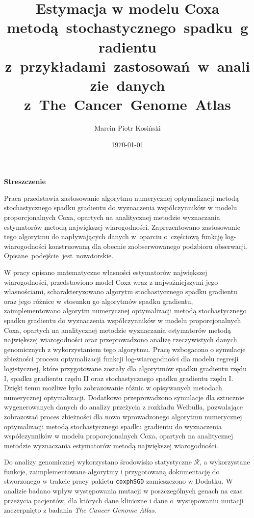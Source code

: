 \documentclass[]{mini}
\title{Estymacja w modelu Coxa metodą~stochastycznego~spadku~gradientu z~przykładami~zastosowań~w~analizie~danych z~The~Cancer~Genome~Atlas}
\author{Marcin Piotr Kosiński}
\date{\today}
\begin{document}
\maketitle

\begin{center}
\textbf{Streszczenie}
\end{center}

Praca przedstawia zastosowanie algorytmu numerycznej optymalizacji metodą stochastycznego spadku gradientu do wyznaczenia współczynników w modelu proporcjonalnych Coxa, opartych na analitycznej metodzie wyznaczania estymatorów metodą największej wiarogodności. Zaprezentowano zastosowanie tego algorytmu do napływających danych w~oparciu o~częściową funkcję log-wiarogodności konstruowaną dla obecnie zaobserwowanego podzbioru obserwacji. Opisane~podejście~jest~nowatorskie. 

W pracy opisano matematyczne własności estymatorów największej wiarogodności, przedstawiono model Coxa wraz z najważniejszymi jego własnościami, scharakteryzowano algorytm stochastycznego spadku gradientu oraz jego różnice w stosunku go algorytmów spadku gradientu, zaimplementowano algorytm numerycznej optymalizacji metodą stochastycznego spadku gradientu do wyznaczenia współczynników w modelu proporcjonalnych Coxa, opartych na analitycznej metodzie wyznaczania estymatorów metodą największej wiarogodności oraz przeprowadzono analizę rzeczywistych danych genomicznych z wykorzystaniem tego algorytmu. Pracę wzbogacono o symulacje zbieżności procesu optymalizacji funkcji log-wiarogodności dla modelu regresji logistycznej, które przygotowane zostały dla algorytmów spadku gradientu rzędu I, spadku gradientu rzędu II oraz stochastycznego spadku gradientu rzędu I. Dzięki temu możliwe było zobrazowanie różnic w opisywanych metodach numerycznej optymalizacji. Dodatkowo przeprowadzono symulacje dla sztucznie wygenerowanych danych do analizy przeżycia z rozkładu Weibulla, pozwalające zobrazować proces zbieżności dla nowo wprowadzonego algorytmu numerycznej optymalizacji metodą stochastycznego spadku gradientu do wyznaczenia współczynników w modelu proporcjonalnych Coxa, opartych na analitycznej metodzie wyznaczania estymatorów metodą największej wiarogodności.

Do analizy genomicznej wykorzystano środowisko statystyczne $\mathcal{R}$, a wykorzystane funkcje, zaimplementowane algorytmy i przygotowaną dokumentację do stworzonego w trakcie pracy pakietu \texttt{coxphSGD} zamieszczono w Dodatku. W analizie badano wpływ występowania mutacji w poszczególnych genach na czas przeżycia pacjentów, dla których dane kliniczne i dane o~występowaniu mutacji zaczerpnięto z badania \textit{The Cancer Genome Atlas}. \ \\
\end{document}
